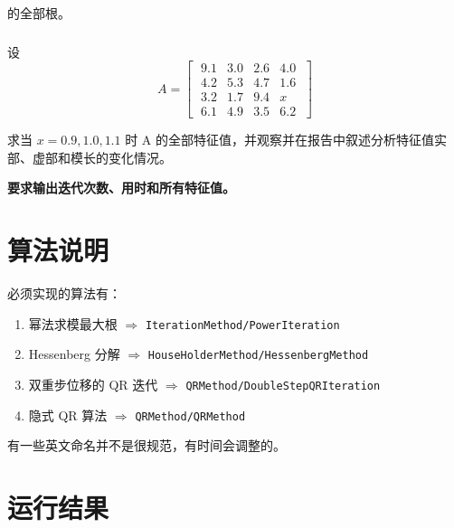 \documentclass{article}
\begin{document}
的全部根。

\subsubsection{}
设
\[
    A=\begin{bmatrix}
    \;9.1 & 3.0 & 2.6 & 4.0 \;\\
    \;4.2 & 5.3 & 4.7 & 1.6 \;\\
    \;3.2 & 1.7 & 9.4 & x \;\\
    \;6.1 & 4.9 & 3.5 & 6.2\;
    \end{bmatrix}
\]

求当 $x = 0.9, 1.0, 1.1$ 时 A 的全部特征值，并观察并在报告中叙述分析特征值实部、虚部和模长的变化情况。

\textbf{要求输出迭代次数、用时和所有特征值。}

\section{算法说明}

必须实现的算法有：

\begin{enumerate}
    \item 幂法求模最大根 $\Rightarrow$ \verb|IterationMethod/PowerIteration|
    \item Hessenberg 分解 $\Rightarrow$ \verb|HouseHolderMethod/HessenbergMethod|
    \item 双重步位移的 QR 迭代 $\Rightarrow$ \verb|QRMethod/DoubleStepQRIteration|
    \item 隐式 QR 算法 $\Rightarrow$ \verb|QRMethod/QRMethod|
\end{enumerate}

有一些英文命名并不是很规范，有时间会调整的。

\section{运行结果}



\newpage
\end{document}
